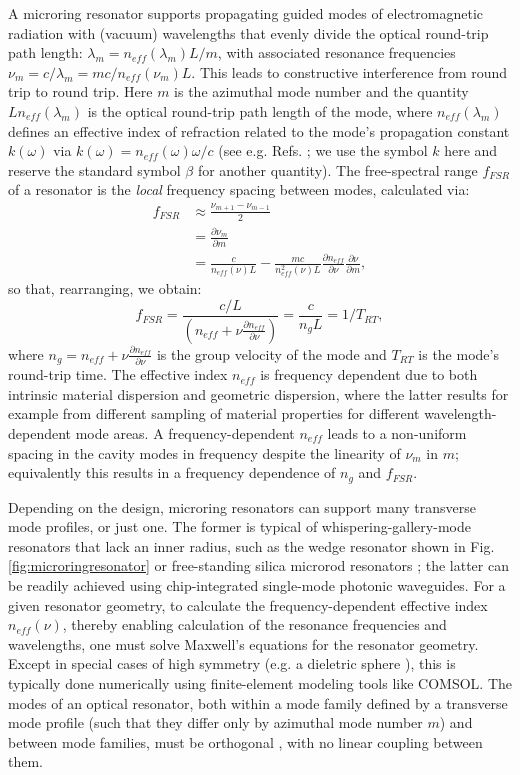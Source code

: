 A microring resonator supports propagating guided modes of electromagnetic radiation with (vacuum) wavelengths that evenly divide the optical round-trip path length: $\lambda_m=n_{eff}(\lambda_m)L/m$, with associated resonance frequencies $\nu_m=c/\lambda_m=mc/n_{eff}(\nu_m)L$. This leads to constructive interference from round trip to round trip. Here $m$ is the azimuthal mode number and the quantity $Ln_{eff}(\lambda_m)$ is the optical round-trip path length of the mode, where $n_{eff}(\lambda_m)$ defines an effective index of refraction related to the mode's propagation constant $k(\omega)$ via $k(\omega)=n_{eff}(\omega)\omega/c$ (see e.g. Refs. \cite{Agrawal2007,Calvo2007}; we use the symbol $k$ here and reserve the standard symbol $\beta$ for another quantity). The free-spectral range $f_{FSR}$ of a resonator is the \textit{local} frequency spacing between modes, calculated via:
\begin{align}
	f_{FSR}&\approx \frac{\nu_{m+1}-\nu_{m-1}}{2}\\
	&=\frac{\partial\nu_m}{\partial m}\\
	&=\frac{c}{n_{eff}(\nu)L}-\frac{mc}{n_{eff}^2(\nu)L}\frac{\partial n_{eff}}{\partial \nu}\frac{\partial \nu}{\partial m},
	\end{align}
	so that, rearranging, we obtain:
	\begin{equation}
	f_{FSR}=\frac{c/L}{\left(n_{eff}+\nu\frac{\partial n_{eff}}{\partial \nu}\right)}=\frac{c}{n_g L}=1/T_{RT},
\end{equation}
	where $n_g=n_{eff}+\nu\frac{\partial n_{eff}}{\partial \nu}$ is the group velocity of the mode and $T_{RT}$ is the mode's round-trip time. The effective index $n_{eff}$ is frequency dependent due to both intrinsic material dispersion and geometric dispersion, where the latter results for example from different sampling of material properties for different wavelength-dependent mode areas. A frequency-dependent $n_{eff}$ leads to a non-uniform spacing in the cavity modes in frequency despite the linearity of $\nu_m$ in $m$; equivalently this results in a frequency dependence of $n_g$ and $f_{FSR}$.
	
Depending on the design, microring resonators can support many transverse mode profiles, or just one. The former is typical of whispering-gallery-mode resonators that lack an inner radius, such as the wedge resonator shown in Fig. \ref{fig:microringresonator} or free-standing silica microrod resonators \cite{DelHaye2013}; the latter can be readily achieved using chip-integrated single-mode photonic waveguides. For a given resonator geometry, to calculate the frequency-dependent effective index $n_{eff}(\nu)$, thereby enabling calculation of the resonance frequencies and wavelengths, one must solve Maxwell's equations for the resonator geometry. Except in special cases of high symmetry (e.g. a dieletric sphere \cite{Oraevsky2002}), this is typically done numerically using finite-element modeling tools like COMSOL. The modes of an optical resonator, both within a mode family defined by a transverse mode profile (such that they differ only by azimuthal mode number $m$) and between mode families, must be orthogonal \cite{Haus1984}, with no linear coupling between them.

